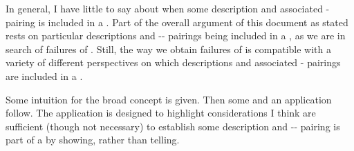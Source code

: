 \begin{note}
  In general, I have little to say about when some description and associated - pairing is included in a \tpro{}.
  Part of the overall argument of this document as stated rests on particular descriptions and -- pairings being included in a \tpro{}, as we are in search of failures of \issueInclusion{}.
  Still, the way we obtain failures of \issueInclusion{} is compatible with a variety of different perspectives on which descriptions and associated - pairings are included in a \tpro{}.

  Some intuition for the broad concept is given.
  Then some  and an application follow.
  The application is designed to highlight considerations I think are sufficient (though not necessary) to establish some description and -- pairing is part of a \tpro{} by showing, rather than telling.
\end{note}



